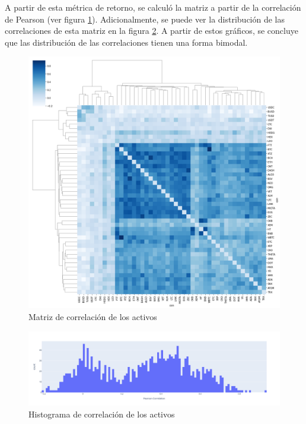 \documentclass[runningheads,a4paper,10pt]{etc/llncs}
\begin{document}
A partir de esta métrica de retorno, se calculó la matriz a partir de la correlación de Pearson (ver figura \ref{fig:corr_matrix}). Adicionalmente, se puede ver la distribución de las correlaciones de esta matriz en la figura \ref{fig:hist_corr}. A partir de estos gráficos, se concluye que las distribución de las correlaciones tienen una forma bimodal.


\begin{figure}[htp]
    \centering
    \includegraphics[scale=0.3]{images/corr_matrix.png}
    \caption{Matriz de correlación de los activos}
    \label{fig:corr_matrix}
\end{figure}


\begin{figure}[htp]
    \centering
    \includegraphics[scale=0.3]{images/correlation_hist.png}
    \caption{Histograma de correlación de los activos}
    \label{fig:hist_corr}
\end{figure}
\end{document}

